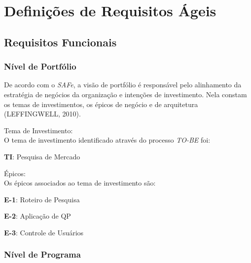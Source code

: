 \section{Definições de Requisitos Ágeis}
	
	\subsection{Requisitos Funcionais}

		\subsubsection{Nível de Portfólio}

			De acordo com o \textit{SAFe}, a visão de portfólio é responsável pelo alinhamento da estratégia de negócios da organização e intenções de investimento. Nela constam os temas de investimentos, os épicos de negócio e de arquitetura (LEFFINGWELL, 2010). 

			\begin{itemize}
			{
				\item Tema de Investimento:\\
				O tema de investimento identificado através do processo \textit{TO-BE} foi:
				\begin{itemize}
				{
					\item \textbf{TI}: Pesquisa de Mercado\\
				}
				\end{itemize}

				\item Épicos:\\
				Os épicos associados ao tema de investimento são:
				\begin{itemize}
				{
					\item \textbf{E-1}: Roteiro de Pesquisa\\

					\item \textbf{E-2}: Aplicação de QP\\

					\item \textbf{E-3}: Controle de Usuários\\
				}
				\end{itemize}
			}
			\end{itemize}


		\subsubsection{Nível de Programa}

